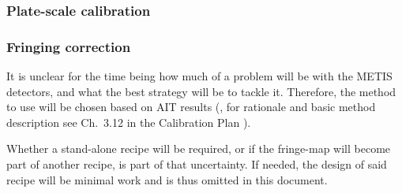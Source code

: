 \subsubsection{Plate-scale calibration}

\subsubsection{Fringing correction}
\label{rec:metis_fringing_correction}

It is unclear for the time being how much of a problem will be with the METIS
detectors, and what the best strategy will be to tackle it. Therefore, the
method to use will be chosen based on AIT results (, for rationale and basic method description see Ch.~3.12 in the Calibration Plan \cite{METIS-calibration_plan}).

Whether a stand-alone recipe will be required, or if the fringe-map will become
part of another recipe, is part of that uncertainty. If needed, the design of
said recipe will be minimal work and is thus omitted in this document.


